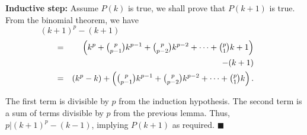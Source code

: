 \begin{frame}
  \begin{tcolorbox}[title=Proof (cont.)]    
    {\bf Inductive step:} Assume $P(k)$ is true, we shall prove that
    $P(k+1)$ is true.  From the binomial theorem, we have
    \[ (k+1)^p - (k+1) \qquad\qquad\qquad\qquad\qquad\qquad\qquad\qquad\qquad \]
    \begin{eqnarray*}
      &=&
      \left(k^p + \tbinom{p}{p-1}k^{p-1} + \tbinom{p}{p-2}k^{p-2}+\cdots + \tbinom{p}{1}k + 1\right)\\
      && - (k+1)\\
      &=&
      \left(k^p - k\right) + \left(\tbinom{p}{p-1}k^{p-1} + \tbinom{p}{p-2}k^{p-2}+\cdots + \tbinom{p}{1}k\right).
    \end{eqnarray*}

    The first term is divisible by $p$ from the induction hypothesis.
    The second term is a sum of terms divisible by $p$ from the
    previous lemma.  Thus, $p|(k+1)^p-(k-1)$, implying $P(k+1)$ as
    required. $\blacksquare$
  \end{tcolorbox}
\end{frame}

